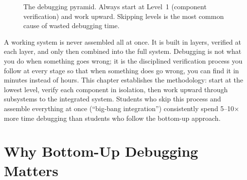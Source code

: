 \documentclass[11pt,letterpaper,twoside,openany]{book}
\begin{document}
\begin{figure}[htbp]
\centering
{}
\caption{The debugging pyramid. Always start at Level~1 (component verification) and work upward. Skipping levels is the most common cause of wasted debugging time.}
\label{fig:debug_pyramid}
\end{figure}

A working system is never assembled all at once. It is built in layers, verified at each layer, and only then combined into the full system. Debugging is not what you do when something goes wrong; it is the disciplined verification process you follow at every stage so that when something does go wrong, you can find it in minutes instead of hours. This chapter establishes the methodology: start at the lowest level, verify each component in isolation, then work upward through subsystems to the integrated system. Students who skip this process and assemble everything at once (``big-bang integration'') consistently spend 5--10$\times$ more time debugging than students who follow the bottom-up approach.

\section{Why Bottom-Up Debugging Matters}
\end{document}
